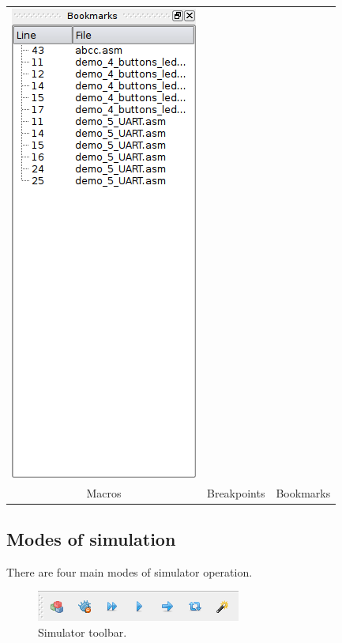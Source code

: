\begin{table}[h!]
\begin{tabular}{ccc}
            \includegraphics[width=.3\textwidth]{img/NewImg/listbookmarks.png}
            \\
            Macros & Breakpoints & Bookmarks
        \end{tabular}
    \end{table}

    
    \subsection{Modes of simulation}
        There are four main modes of simulator operation.

        \begin{figure}[h!]
            \centering{}
            \includegraphics[width=.4\textwidth]{img/simulation_panel.png}
            \caption{Simulator toolbar.}
        \end{figure}

